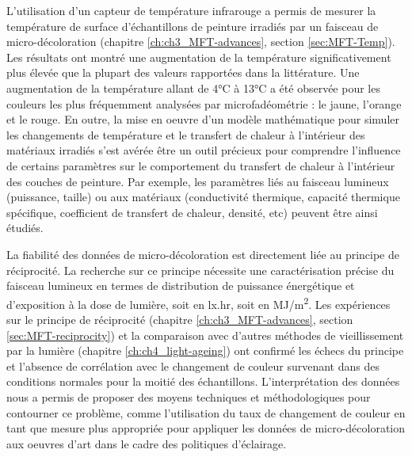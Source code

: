 L'utilisation d'un capteur de température infrarouge a permis de mesurer la température de surface d'échantillons de peinture irradiés par un faisceau de micro-décoloration (chapitre \ref{ch:ch3_MFT-advances}, section \ref{sec:MFT-Temp}). Les résultats ont montré une augmentation de la température significativement plus élevée que la plupart des valeurs rapportées dans la littérature. Une augmentation de la température allant de 4\unit{\degreeCelsius} à 13\unit{\degreeCelsius} a été observée pour les couleurs les plus fréquemment analysées par microfadéométrie : le jaune, l'orange et le rouge. En outre, la mise en oeuvre d'un modèle mathématique pour simuler les changements de température et le transfert de chaleur à l'intérieur des matériaux irradiés s'est avérée être un outil précieux pour comprendre l'influence de certains paramètres sur le comportement du transfert de chaleur à l'intérieur des couches de peinture. Par exemple, les paramètres liés au faisceau lumineux (puissance, taille) ou aux matériaux (conductivité thermique, capacité thermique spécifique, coefficient de transfert de chaleur, densité, etc) peuvent être ainsi étudiés.\\

\vspace{0.5mm}

La fiabilité des données de micro-décoloration est directement liée au principe de réciprocité. La recherche sur ce principe nécessite une caractérisation précise du faisceau lumineux en termes de distribution de puissance énergétique et d'exposition à la dose de lumière, soit en lx.hr, soit en MJ/m\textsuperscript{2}. Les expériences sur le principe de réciprocité (chapitre \ref{ch:ch3_MFT-advances}, section \ref{sec:MFT-reciprocity}) et la comparaison avec d'autres méthodes de vieillissement par la lumière (chapitre \ref{ch:ch4_light-ageing}) ont confirmé les échecs du principe et l'absence de corrélation avec le changement de couleur survenant dans des conditions normales pour la moitié des échantillons. L'interprétation des données nous a permis de proposer des moyens techniques et méthodologiques pour contourner ce problème, comme l'utilisation du taux de changement de couleur en tant que mesure plus appropriée pour appliquer les données de micro-décoloration aux oeuvres d'art dans le cadre des politiques d'éclairage.\\

\vspace{0.5mm}

